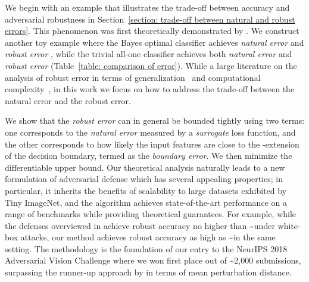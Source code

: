 \documentclass[11pt]{article}
\newcommand{\0}{\mathbf{0}}
\newcommand{\1}{\mathbf{1}}
\begin{document}
We begin with an example that illustrates the trade-off between accuracy and adversarial robustness in Section~\ref{section: trade-off between natural and robust errors}. This phenomenon was first theoretically demonstrated by \cite{tsipras2018robustness}. We construct another toy example where the Bayes optimal classifier achieves \emph{natural error}  and \emph{robust error} , while the trivial all-one classifier achieves both \emph{natural error} and \emph{robust error}  (Table~\ref{table: comparison of error}). While a large literature on the analysis of robust error in terms of generalization~\cite{schmidt2018adversarially,NIPS2018_7307,yin2018rademacher} and computational complexity~\cite{bubeck2018adversarial1,bubeck2018adversarial2}, in this work we focus on how to address the trade-off between the natural error and the robust error.

We show that the \emph{robust error} can in general be bounded tightly using two terms: one corresponds to the \emph{natural error} measured by a \emph{surrogate} loss function, and the other corresponds to how likely the input features are close to the -extension of the decision boundary, termed as the \emph{boundary error}. We then minimize the differentiable upper bound. Our theoretical analysis naturally leads to a new formulation of adversarial defense which has several appealing properties; in particular, it inherits the benefits of scalability to large datasets exhibited by Tiny ImageNet, and the algorithm
achieves state-of-the-art performance on a range of benchmarks while providing theoretical guarantees. For example, while the defenses overviewed in \cite{athalye2018obfuscated} achieve robust accuracy no higher than \textasciitilde under white-box attacks, our method achieves robust accuracy as high as \textasciitilde in the same setting. The methodology is the foundation of our entry to the NeurIPS 2018 Adversarial Vision Challenge where we won first place out of \textasciitilde2,000 submissions, surpassing the runner-up approach by  in terms of mean  perturbation distance.
\end{document}
